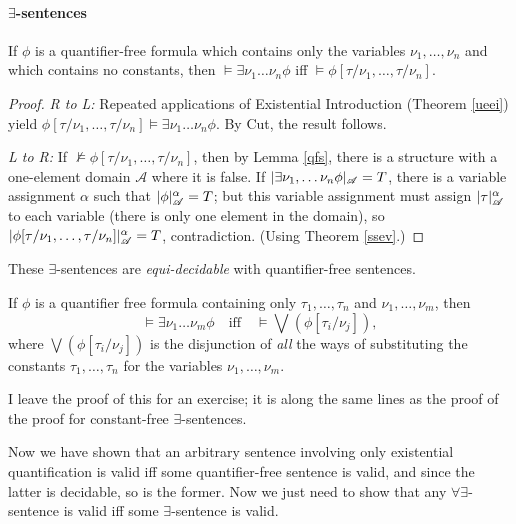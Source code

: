 \paragraph{$\exists$-sentences}

\begin{theorem}
	If $\phi$ is a quantifier-free formula which contains only the variables $\nu_{1},\ldots, \nu_{n}$ and which contains no constants, then $\vDash \exists \nu_{1}\ldots\nu_{n} \phi$ iff $\vDash \phi[\tau/\nu_{1},\ldots,\tau/\nu_{n}]$. \begin{proof}
		{\emph{R to L:} Repeated applications of Existential Introduction (Theorem \ref{ueei}) yield $\phi[\tau/\nu_{1},\ldots,\tau/\nu_{n}] \vDash \exists \nu_{1}\ldots\nu_{n} \phi$. By Cut, the result follows.
		
		 \emph{L to R:} If $\not\vDash \phi[\tau/\nu_{1},\ldots,\tau/\nu_{n}]$, then by Lemma \ref{qfs}, there is a structure with a  one-element domain $\mathscr{A}$ where it is false.  If $|\exists \nu_{1},\ldots\nu_{n} \phi|_{\mathscr{A}}=T$, there is a variable assignment $\alpha$ such that $|\phi|^{\alpha}_{\mathscr{A}}=T$; but this variable assignment must assign $|\tau|^{\alpha}_{\mathscr{A}}$ to each variable (there is only one element in the domain), so $|\phi[\tau/\nu_{1},\ldots,\tau/\nu_{n}]|^{\alpha}_{\mathscr{A}}=T$, contradiction. (Using Theorem \ref{ssev}.)}
	\end{proof}
\end{theorem}
These $\exists$-sentences are \emph{equi-decidable} with quantifier-free sentences.

\begin{theorem}
	If $\phi$ is a quantifier free formula containing only $\tau_{1},\ldots,\tau_{n}$ and $\nu_{1},\ldots,\nu_{m}$, then $$\vDash\exists \nu_{1}\ldots\nu_{m}\phi \quad\text{iff}\quad \vDash \bigvee (\phi[\tau_{i}/\nu_{j}]),$$ where $\bigvee (\phi[\tau_{i}/\nu_{j}])$ is the disjunction of \emph{all} the ways of substituting the constants $\tau_{1},\ldots,\tau_{n}$ for the variables $\nu_{1},\ldots,\nu_{m}$.
\end{theorem}

I leave the proof of this for an exercise; it is along the same lines as the proof of the proof for constant-free $\exists$-sentences.

Now we have shown that an arbitrary sentence involving only existential quantification is valid iff some quantifier-free sentence is valid, and since the latter is decidable, so is the former. Now we just need to show that any $\forall\exists$-sentence is valid iff some $\exists$-sentence is valid.


